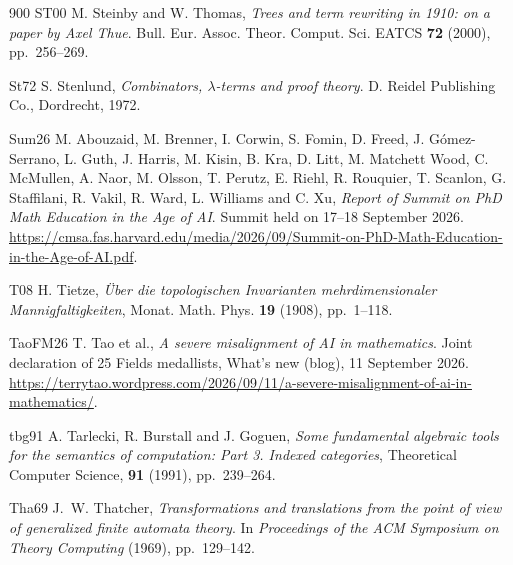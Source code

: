 \begin{thebibliography}{900}
\bibitem%
{ST00} M. Steinby and W. Thomas, \emph{Trees and term rewriting in 1910: on a paper by Axel Thue}. Bull. Eur. Assoc. Theor. Comput. Sci. EATCS \textbf{72} (2000), pp.~256--269.

\bibitem%
{St72} S. Stenlund, \emph{Combinators, $\lambda$-terms and proof theory}. D. Reidel Publishing Co., Dordrecht, 1972.

\bibitem%
{Sum26} M. Abouzaid, M. Brenner, I. Corwin, S. Fomin, D. Freed, J. G\'{o}mez-Serrano, L. Guth, J. Harris, M. Kisin, B. Kra, D. Litt, M. Matchett Wood, C. McMullen, A. Naor, M. Olsson, T. Perutz, E. Riehl, R. Rouquier, T. Scanlon, G. Staffilani, R. Vakil, R. Ward, L. Williams and C. Xu, \emph{Report of Summit on PhD Math Education in the Age of AI}. Summit held on 17--18 September 2026. \url{https://cmsa.fas.harvard.edu/media/2026/09/Summit-on-PhD-Math-Education-in-the-Age-of-AI.pdf}.

\bibitem%
{T08} H. Tietze, \emph{\"{U}ber die topologischen Invarianten mehrdimensionaler Mannigfaltigkeiten}, Monat. Math. Phys. \textbf{19} (1908), pp.~1--118.

\bibitem%
{TaoFM26} T. Tao et al., \emph{A severe misalignment of AI in mathematics}. Joint declaration of 25 Fields medallists, What's new (blog), 11 September 2026. \url{https://terrytao.wordpress.com/2026/09/11/a-severe-misalignment-of-ai-in-mathematics/}.

\bibitem%
{tbg91} A. Tarlecki, R. Burstall and J. Goguen, \emph{Some fundamental algebraic tools for the semantics of computation: Part 3. Indexed categories}, Theoretical Computer Science, \textbf{91} (1991), pp.~239--264.


\bibitem%
{Tha69} J.~W. Thatcher, \emph{Transformations and translations from the point of view of generalized finite automata theory}. In \emph{Proceedings of the ACM Symposium on Theory Computing} (1969),
pp.~129--142.


%


\end{thebibliography}
